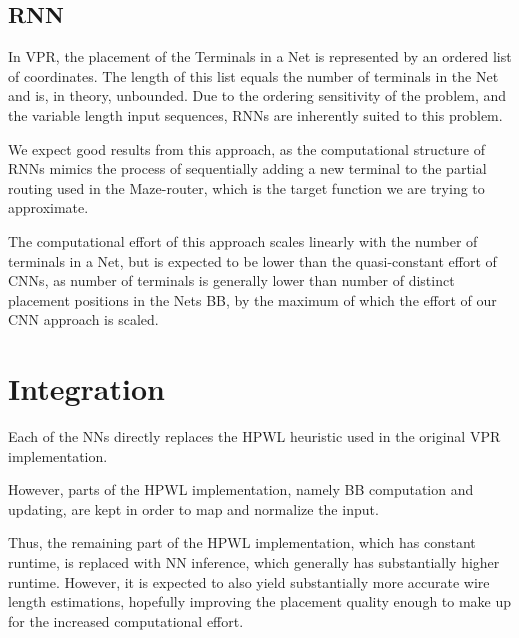 \subsection{\gls{RNN}}

In \gls{VPR}, the placement of the Terminals in a Net is represented by an ordered list of coordinates. The length of this list equals the number of terminals in the Net and is, in theory, unbounded. Due to the ordering sensitivity of the problem, and the variable length input sequences, \glspl{RNN} are inherently suited to this problem.

We expect good results from this approach, as the computational structure of \glspl{RNN} mimics the process of sequentially adding a new terminal to the partial routing used in the Maze-router, which is the target function we are trying to approximate.

The computational effort of this approach scales linearly with the number of terminals in a Net, but is expected to be lower than the quasi-constant effort of \glspl{CNN}, as number of terminals is generally lower than number of distinct placement positions in the Nets \gls{BB}, by the maximum of which the effort of our CNN approach is scaled.

\section{Integration}

Each of the \glspl{NN} directly replaces the \gls{HPWL} heuristic used in the original \gls{VPR} implementation.

However, parts of the \gls{HPWL} implementation, namely \gls{BB} computation and updating, are kept in order to map and normalize the input.

Thus, the remaining part of the \gls{HPWL} implementation, which has constant runtime, is replaced with \gls{NN} inference, which generally has substantially higher runtime. However, it is expected to also yield substantially more accurate wire length estimations, hopefully improving the placement quality enough to make up for the increased computational effort.



